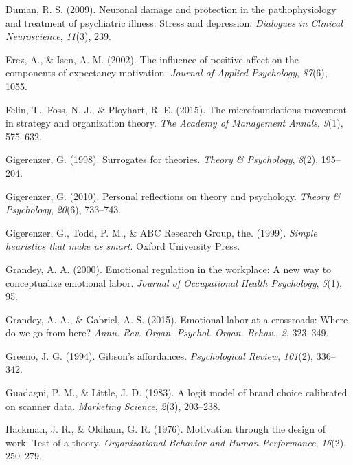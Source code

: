 \documentclass[english,,man]{apa6}
\theoremstyle{definition}
\theoremstyle{definition}
\theoremstyle{definition}
\theoremstyle{remark}
\begin{document}
\leavevmode\hypertarget{ref-duman2009}{}%
Duman, R. S. (2009). Neuronal damage and protection in the
pathophysiology and treatment of psychiatric illness: Stress and
depression. \emph{Dialogues in Clinical Neuroscience}, \emph{11}(3),
239.

\leavevmode\hypertarget{ref-erez2002}{}%
Erez, A., \& Isen, A. M. (2002). The influence of positive affect on the
components of expectancy motivation. \emph{Journal of Applied
Psychology}, \emph{87}(6), 1055.

\leavevmode\hypertarget{ref-felin2015}{}%
Felin, T., Foss, N. J., \& Ployhart, R. E. (2015). The microfoundations
movement in strategy and organization theory. \emph{The Academy of
Management Annals}, \emph{9}(1), 575--632.

\leavevmode\hypertarget{ref-gigerenzer1998}{}%
Gigerenzer, G. (1998). Surrogates for theories. \emph{Theory \&
Psychology}, \emph{8}(2), 195--204.

\leavevmode\hypertarget{ref-gigerenzer2010}{}%
Gigerenzer, G. (2010). Personal reflections on theory and psychology.
\emph{Theory \& Psychology}, \emph{20}(6), 733--743.

\leavevmode\hypertarget{ref-gigerenzer1999}{}%
Gigerenzer, G., Todd, P. M., \& ABC Research Group, the. (1999).
\emph{Simple heuristics that make us smart}. Oxford University Press.

\leavevmode\hypertarget{ref-grandey2000}{}%
Grandey, A. A. (2000). Emotional regulation in the workplace: A new way
to conceptualize emotional labor. \emph{Journal of Occupational Health
Psychology}, \emph{5}(1), 95.

\leavevmode\hypertarget{ref-grandey2015}{}%
Grandey, A. A., \& Gabriel, A. S. (2015). Emotional labor at a
crossroads: Where do we go from here? \emph{Annu. Rev. Organ. Psychol.
Organ. Behav.}, \emph{2}, 323--349.

\leavevmode\hypertarget{ref-greeno1994}{}%
Greeno, J. G. (1994). Gibson's affordances. \emph{Psychological Review},
\emph{101}(2), 336--342.

\leavevmode\hypertarget{ref-guadagni1983}{}%
Guadagni, P. M., \& Little, J. D. (1983). A logit model of brand choice
calibrated on scanner data. \emph{Marketing Science}, \emph{2}(3),
203--238.

\leavevmode\hypertarget{ref-hackman1976}{}%
Hackman, J. R., \& Oldham, G. R. (1976). Motivation through the design
of work: Test of a theory. \emph{Organizational Behavior and Human
Performance}, \emph{16}(2), 250--279.
\end{document}
